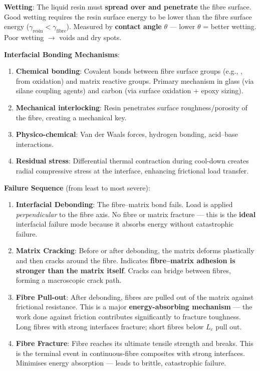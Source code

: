\documentclass{NoteThesis/note-thesis}
\begin{document}
\textbf{Wetting}:
The liquid resin must \textbf{spread over and penetrate} the fibre surface. Good wetting requires the resin surface energy to be lower than the fibre surface energy ($\gamma_{\text{resin}} < \gamma_{\text{fibre}}$). Measured by \textbf{contact angle} $\theta$ — lower $\theta$ = better wetting. Poor wetting $\to$ voids and dry spots.

\textbf{Interfacial Bonding Mechanisms}:
\begin{enumerate}
    \item \textbf{Chemical bonding}: Covalent bonds between fibre surface groups (e.g., ,  from oxidation) and matrix reactive groups. Primary mechanism in glass (via silane coupling agents) and carbon (via surface oxidation + epoxy sizing).
    \item \textbf{Mechanical interlocking}: Resin penetrates surface roughness/porosity of the fibre, creating a mechanical key.
    \item \textbf{Physico-chemical}: Van der Waals forces, hydrogen bonding, acid--base interactions.
    \item \textbf{Residual stress}: Differential thermal contraction during cool-down creates radial compressive stress at the interface, enhancing frictional load transfer.
\end{enumerate}

\textbf{Failure Sequence} (from least to most severe):
\begin{enumerate}
    \item \textbf{Interfacial Debonding}: The fibre--matrix bond fails. Load is applied \textit{perpendicular} to the fibre axis. No fibre or matrix fracture — this is the \textbf{ideal} interfacial failure mode because it absorbs energy without catastrophic failure.
    \item \textbf{Matrix Cracking}: Before or after debonding, the matrix deforms plastically and then cracks around the fibre. Indicates \textbf{fibre--matrix adhesion is stronger than the matrix itself}. Cracks can bridge between fibres, forming a macroscopic crack path.
    \item \textbf{Fibre Pull-out}: After debonding, fibres are pulled out of the matrix against frictional resistance. This is a major \textbf{energy-absorbing mechanism} — the work done against friction contributes significantly to fracture toughness. Long fibres with strong interfaces fracture; short fibres below $L_c$ pull out.
    \item \textbf{Fibre Fracture}: Fibre reaches its ultimate tensile strength and breaks. This is the terminal event in continuous-fibre composites with strong interfaces. Minimises energy absorption — leads to brittle, catastrophic failure.
\end{enumerate}
\end{document}
